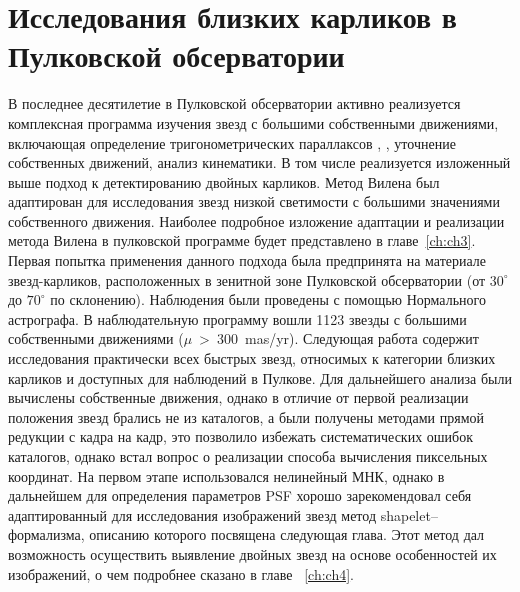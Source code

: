 \section{Исследования близких карликов в Пулковской обсерватории} \label{sec:ch1/sec4}
В последнее десятилетие в Пулковской обсерватории активно реализуется комплексная программа изучения звезд с большими собственными движениями, включающая определение тригонометрических параллаксов  \cite{2010AstL...36..576K}, \cite{2013MNRAS.435.1083K}, уточнение собственных движений, анализ кинематики. В том числе реализуется изложенный выше подход к детектированию двойных карликов. Метод Вилена был адаптирован для исследования звезд низкой светимости с большими значениями собственного движения. Наиболее подробное изложение адаптации и реализации метода Вилена в пулковской программе будет представлено в главе~\ref{ch:ch3}. Первая попытка применения данного подхода \cite{2011AstL...37..420K} была предпринята на материале звезд-карликов, расположенных в зенитной зоне Пулковской обсерватории (от $30^\circ$ до $70^\circ$ по склонению). Наблюдения были проведены с помощью Нормального астрографа. В наблюдательную программу вошли 1123 звезды с большими собственными движениями ($\mu$~>~300~mas/yr). Следующая работа \cite{2015AstL...41..833K} содержит исследования практически всех быстрых звезд, относимых к категории близких карликов и доступных для наблюдений в Пулкове. Для дальнейшего анализа были вычислены собственные движения, однако в отличие от первой реализации положения звезд брались не из каталогов, а были получены методами прямой редукции с кадра на кадр, это позволило избежать систематических ошибок каталогов, однако встал вопрос о реализации способа вычисления пиксельных координат. На первом этапе использовался нелинейный МНК, однако в дальнейшем для определения параметров PSF хорошо зарекомендовал себя адаптированный для исследования изображений звезд метод shapelet--формализма, описанию которого посвящена следующая глава. Этот метод дал возможность осуществить выявление двойных звезд на основе особенностей их изображений, о чем подробнее сказано в главе ~\ref{ch:ch4}.